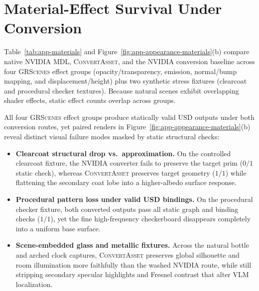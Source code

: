 \section{Material-Effect Survival Under Conversion}
\label{app:materials}

Table~\ref{tab:app-materials} and Figure~\ref{fig:app-appearance-materials}(b) compare native \textsc{NVIDIA MDL}, \textsc{ConvertAsset}, and the \textsc{NVIDIA} \usdps{} conversion baseline across four \textsc{GRScenes} effect groups (opacity/transparency, emission, normal/bump mapping, and displacement/height) plus two synthetic stress fixtures (clearcoat and procedural checker textures). Because natural scenes exhibit overlapping shader effects, static effect counts overlap across groups.

\begin{table}[!htbp]
\centering\small
\resizebox{\linewidth}{!}{}
\caption{Static material-effect survival inventory across native \textsc{MDL}, \textsc{ConvertAsset}, and the \textsc{NVIDIA} baseline (checks verify target prim presence and zero remaining active \textsc{MDL}).}
\label{tab:app-materials}
\end{table}

All four \textsc{GRScenes} effect groups produce statically valid USD outputs under both conversion routes, yet paired renders in Figure~\ref{fig:app-appearance-materials}(b) reveal distinct visual failure modes masked by static structural checks:
\begin{itemize}
    \item \textbf{Clearcoat structural drop vs.\ approximation.} On the controlled clearcoat fixture, the \textsc{NVIDIA} converter fails to preserve the target prim ($0/1$ static check), whereas \textsc{ConvertAsset} preserves target geometry ($1/1$) while flattening the secondary coat lobe into a higher-albedo surface response.
    \item \textbf{Procedural pattern loss under valid USD bindings.} On the procedural checker fixture, both converted outputs pass all static graph and binding checks ($1/1$), yet the fine high-frequency checkerboard disappears completely into a uniform base surface.
    \item \textbf{Scene-embedded glass and metallic fixtures.} Across the natural bottle and arched clock captures, \textsc{ConvertAsset} preserves global silhouette and room illumination more faithfully than the washed \textsc{NVIDIA} route, while still stripping secondary specular highlights and Fresnel contrast that alter \textsc{VLM} localization.
\end{itemize}
